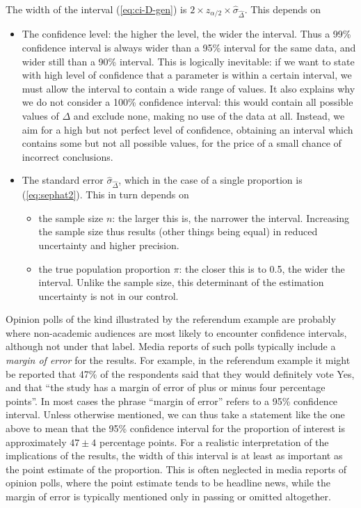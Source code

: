\documentclass[11pt,a4paper,openany]{book}
\begin{document}
The width of the interval (\ref{eq:ci-D-gen}) is
\(2\times z_{\alpha/2}\times \hat{\sigma}_{\hat{\Delta}}\). This depends
on

\begin{itemize}
\item
  The confidence level: the higher the level, the wider the interval.
  Thus a 99\% confidence interval is always wider than a 95\% interval
  for the same data, and wider still than a 90\% interval. This is
  logically inevitable: if we want to state with high level of
  confidence that a parameter is within a certain interval, we must
  allow the interval to contain a wide range of values. It also explains
  why we do not consider a 100\% confidence interval: this would contain
  all possible values of \(\Delta\) and exclude none, making no use of
  the data at all. Instead, we aim for a high but not perfect level of
  confidence, obtaining an interval which contains some but not all
  possible values, for the price of a small chance of incorrect
  conclusions.
\item
  The standard error \(\hat{\sigma}_{\hat{\Delta}}\), which in the case
  of a single proportion is (\ref{eq:sephat2}). This in turn depends on

  \begin{itemize}
  \item
    the sample size \(n\): the larger this is, the narrower the
    interval. Increasing the sample size thus results (other things
    being equal) in reduced uncertainty and higher precision.
  \item
    the true population proportion \(\pi\): the closer this is to 0.5,
    the wider the interval. Unlike the sample size, this determinant of
    the estimation uncertainty is not in our control.
  \end{itemize}
\end{itemize}

Opinion polls of the kind illustrated by the referendum example are
probably where non-academic audiences are most likely to encounter
confidence intervals, although not under that label. Media reports of
such polls typically include a \emph{margin of error} for the results.
For example, in the referendum example it might be reported that 47\% of
the respondents said that they would definitely vote Yes, and that ``the
study has a margin of error of plus or minus four percentage points''.
In most cases the phrase ``margin of error'' refers to a 95\% confidence
interval. Unless otherwise mentioned, we can thus take a statement like
the one above to mean that the 95\% confidence interval for the
proportion of interest is approximately \(47\pm 4\) percentage points.
For a realistic interpretation of the implications of the results, the
width of this interval is at least as important as the point estimate of
the proportion. This is often neglected in media reports of opinion
polls, where the point estimate tends to be headline news, while the
margin of error is typically mentioned only in passing or omitted
altogether.
\end{document}
